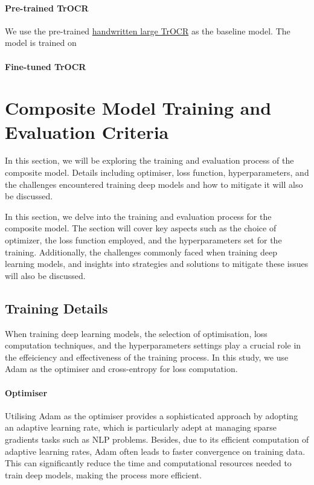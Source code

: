 \paragraph*{Pre-trained TrOCR}
\label{par:4_pre-trained_trocr}
We use the pre-trained \href{https://huggingface.co/microsoft/trocr-large-handwritten}{handwritten large TrOCR} as the baseline model. The model is trained on 
\paragraph*{Fine-tuned TrOCR}
\label{par:4_fine_tuned_trocr}
\section{Composite Model Training and Evaluation Criteria}
\label{sec:3_model_training_and_evaluation_criteria}
In this section, we will be exploring the training and evaluation process of the composite model. Details including optimiser, loss function, hyperparameters, and the challenges encountered training deep models and how to mitigate it will also be discussed.

In this section, we delve into the training and evaluation process for the composite model. The section will cover key aspects such as the choice of optimizer, the loss function employed, and the hyperparameters set for the training. Additionally, the challenges commonly faced when training deep learning models, and insights into strategies and solutions to mitigate these issues will also be discussed.
\subsection{Training Details}
\label{subsec:3_training_details}
When training deep learning models, the selection of optimisation, loss computation techniques, and the hyperparameters settings play a crucial role in the effeiciency and effectiveness of the training process. In this study, we use Adam as the optimiser and cross-entropy for loss computation.

\paragraph*{Optimiser}
\label{par:3_Optimiser}
Utilising Adam as the optimiser provides a sophisticated approach by adopting an adaptive learning rate, which is particularly adept at managing sparse gradients tasks such as NLP problems. Besides, due to its efficient computation of adaptive learning rates, Adam often leads to faster convergence on training data. This can significantly reduce the time and computational resources needed to train deep models, making the process more efficient.

